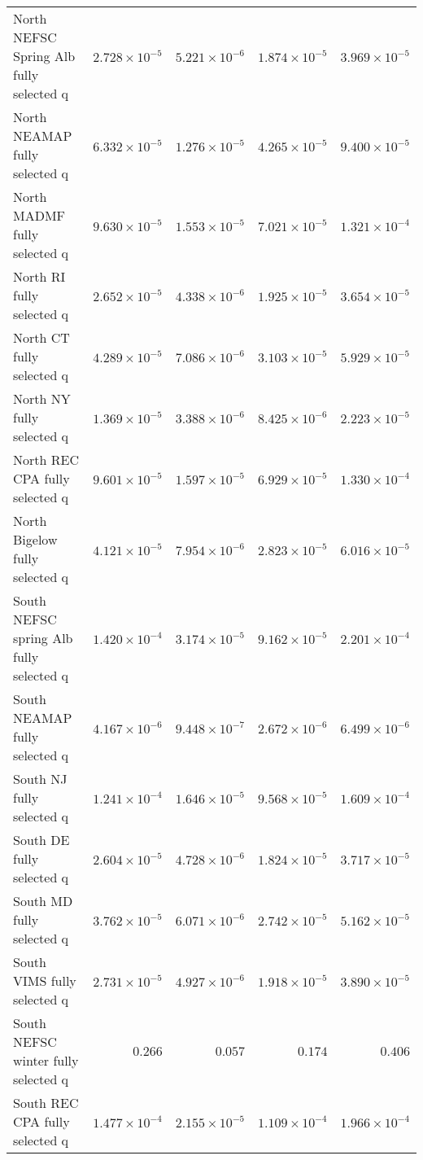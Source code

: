 \documentclass[
]{article}
\begin{document}
\begin{landscape}
\begin{longtable}[t]{lrrrr}
\addlinespace
North NEFSC Spring Alb fully selected q & $2.728\times 10^{-5}$ & $5.221\times 10^{-6}$ & $1.874\times 10^{-5}$ & $3.969\times 10^{-5}$\\
North NEAMAP fully selected q & $6.332\times 10^{-5}$ & $1.276\times 10^{-5}$ & $4.265\times 10^{-5}$ & $9.400\times 10^{-5}$\\
North MADMF fully selected q & $9.630\times 10^{-5}$ & $1.553\times 10^{-5}$ & $7.021\times 10^{-5}$ & $1.321\times 10^{-4}$\\
North RI fully selected q & $2.652\times 10^{-5}$ & $4.338\times 10^{-6}$ & $1.925\times 10^{-5}$ & $3.654\times 10^{-5}$\\
North CT fully selected q & $4.289\times 10^{-5}$ & $7.086\times 10^{-6}$ & $3.103\times 10^{-5}$ & $5.929\times 10^{-5}$\\
\addlinespace
North NY fully selected q & $1.369\times 10^{-5}$ & $3.388\times 10^{-6}$ & $8.425\times 10^{-6}$ & $2.223\times 10^{-5}$\\
North REC CPA fully selected q & $9.601\times 10^{-5}$ & $1.597\times 10^{-5}$ & $6.929\times 10^{-5}$ & $1.330\times 10^{-4}$\\
North Bigelow fully selected q & $4.121\times 10^{-5}$ & $7.954\times 10^{-6}$ & $2.823\times 10^{-5}$ & $6.016\times 10^{-5}$\\
South NEFSC spring Alb fully selected q & $1.420\times 10^{-4}$ & $3.174\times 10^{-5}$ & $9.162\times 10^{-5}$ & $2.201\times 10^{-4}$\\
South NEAMAP fully selected q & $4.167\times 10^{-6}$ & $9.448\times 10^{-7}$ & $2.672\times 10^{-6}$ & $6.499\times 10^{-6}$\\
\addlinespace
South NJ fully selected q & $1.241\times 10^{-4}$ & $1.646\times 10^{-5}$ & $9.568\times 10^{-5}$ & $1.609\times 10^{-4}$\\
South DE fully selected q & $2.604\times 10^{-5}$ & $4.728\times 10^{-6}$ & $1.824\times 10^{-5}$ & $3.717\times 10^{-5}$\\
South MD fully selected q & $3.762\times 10^{-5}$ & $6.071\times 10^{-6}$ & $2.742\times 10^{-5}$ & $5.162\times 10^{-5}$\\
South VIMS fully selected q & $2.731\times 10^{-5}$ & $4.927\times 10^{-6}$ & $1.918\times 10^{-5}$ & $3.890\times 10^{-5}$\\
South NEFSC winter fully selected q & $0.266$ & $0.057$ & $0.174$ & $0.406$\\
\addlinespace
South REC CPA fully selected q & $1.477\times 10^{-4}$ & $2.155\times 10^{-5}$ & $1.109\times 10^{-4}$ & $1.966\times 10^{-4}$\\

\end{longtable}
\end{landscape}
\end{document}

